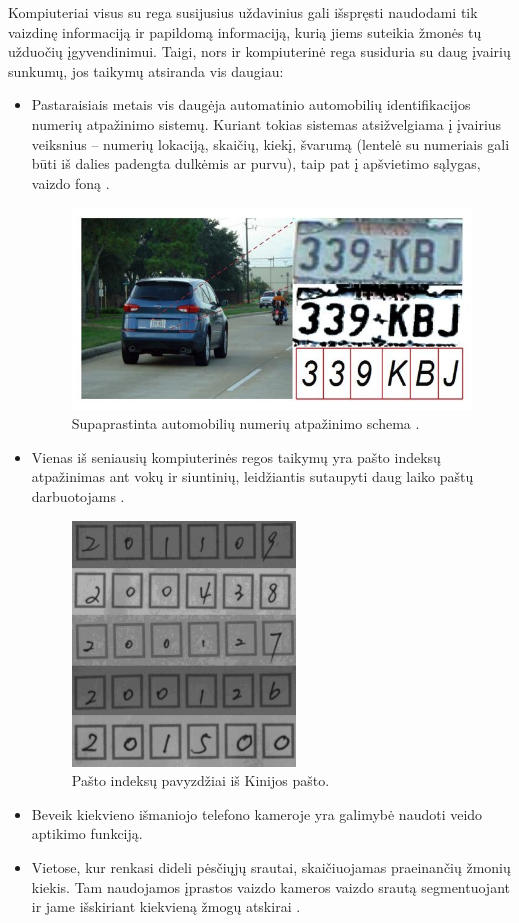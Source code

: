 \documentclass[a4paper,12pt]{article}
\begin{document}
Kompiuteriai visus su rega susijusius uždavinius gali išspręsti naudodami tik vaizdinę informaciją ir papildomą informaciją, kurią jiems suteikia žmonės tų užduočių įgyvendinimui. Taigi, nors ir kompiuterinė rega susiduria su daug įvairių sunkumų, jos taikymų atsiranda vis daugiau:
\begin{itemize}
\item Pastaraisiais metais vis daugėja automatinio automobilių identifikacijos numerių atpažinimo sistemų. Kuriant tokias sistemas atsižvelgiama į įvairius veiksnius – numerių lokaciją, skaičių, kiekį, švarumą (lentelė su numeriais gali būti iš dalies padengta dulkėmis ar purvu), taip pat į apšvietimo sąlygas, vaizdo foną \cite{CARPLATE}.
\begin{figure}[H]
	\centering
	\includegraphics[scale=0.5]{images/carplate}
	\caption{Supaprastinta automobilių numerių atpažinimo schema \cite{PLATEIMG}.}   %
	\label{img:carplate}
\end{figure}
\item Vienas iš seniausių kompiuterinės regos taikymų yra pašto indeksų atpažinimas ant vokų ir siuntinių, leidžiantis sutaupyti daug laiko paštų darbuotojams \cite{POSTCODE}.
\begin{figure}[H]
	\centering
	\includegraphics[scale=0.4]{images/postcode}
	\caption{Pašto indeksų pavyzdžiai iš Kinijos pašto.}   %
	\label{img:postcode}
\end{figure}
\item Beveik kiekvieno išmaniojo telefono kameroje yra galimybė naudoti veido aptikimo funkciją.
\item Vietose, kur renkasi dideli pėsčiųjų srautai, skaičiuojamas praeinančių žmonių kiekis. Tam naudojamos įprastos vaizdo kameros vaizdo srautą segmentuojant ir jame išskiriant kiekvieną žmogų atskirai \cite{PEOPLECOUNT}.
\end{itemize}
\end{document}

